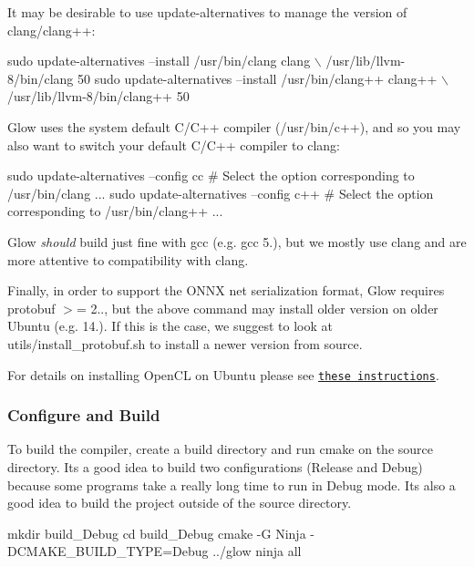 It may be desirable to use {\ttfamily update-\/alternatives} to manage the version of clang/clang++\+:


\begin{DoxyCode}
sudo update-alternatives --install /usr/bin/clang clang \(\backslash\)
    /usr/lib/llvm-8/bin/clang 50
sudo update-alternatives --install /usr/bin/clang++ clang++ \(\backslash\)
    /usr/lib/llvm-8/bin/clang++ 50
\end{DoxyCode}


Glow uses the system default C/\+C++ compiler (/usr/bin/c++), and so you may also want to switch your default C/\+C++ compiler to clang\+:


\begin{DoxyCode}
sudo update-alternatives --config cc
    # Select the option corresponding to /usr/bin/clang ...
sudo update-alternatives --config c++
    # Select the option corresponding to /usr/bin/clang++ ...
\end{DoxyCode}


Glow {\itshape should} build just fine with gcc (e.\+g. gcc 5.), but we mostly use clang and are more attentive to compatibility with clang.

Finally, in order to support the O\+N\+NX net serialization format, Glow requires {\ttfamily protobuf $>$= 2..}, but the above command may install older version on older Ubuntu (e.\+g. 14.). If this is the case, we suggest to look at {\ttfamily utils/install\+\_\+protobuf.\+sh} to install a newer version from source.

For details on installing Open\+CL on Ubuntu please see \href{docs/Building.md#opencl-on-ubuntu}{\tt these instructions}.

\subsubsection*{Configure and Build}

To build the compiler, create a build directory and run cmake on the source directory. It\textquotesingle{}s a good idea to build two configurations (Release and Debug) because some programs take a really long time to run in Debug mode. It\textquotesingle{}s also a good idea to build the project outside of the source directory.


\begin{DoxyCode}
mkdir build\_Debug
cd build\_Debug
cmake -G Ninja -DCMAKE\_BUILD\_TYPE=Debug ../glow
ninja all
\end{DoxyCode}



